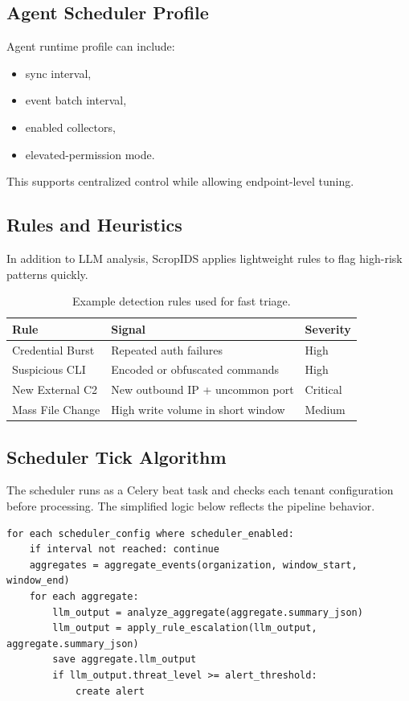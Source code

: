 \documentclass[conference]{IEEEtran}
\begin{document}
\subsection{Agent Scheduler Profile}
Agent runtime profile can include:
\begin{itemize}[leftmargin=1.2em]
    \item sync interval,
    \item event batch interval,
    \item enabled collectors,
    \item elevated-permission mode.
\end{itemize}
This supports centralized control while allowing endpoint-level tuning.

\subsection{Rules and Heuristics}
In addition to LLM analysis, ScropIDS applies lightweight rules to flag high-risk patterns quickly.
\begin{table}[!t]
\centering
\begin{tabular}{>{\raggedright\arraybackslash}p{} >{\raggedright\arraybackslash}p{} >{\raggedright\arraybackslash}p{}}
\toprule
\textbf{Rule} & \textbf{Signal} & \textbf{Severity} \\
\midrule
Credential Burst & Repeated auth failures & High \\
Suspicious CLI & Encoded or obfuscated commands & High \\
New External C2 & New outbound IP + uncommon port & Critical \\
Mass File Change & High write volume in short window & Medium \\
\bottomrule
\end{tabular}
\caption{Example detection rules used for fast triage.}
\label{tab:rules}
\end{table}

\subsection{Scheduler Tick Algorithm}
The scheduler runs as a Celery beat task and checks each tenant configuration before processing. The simplified logic below reflects the pipeline behavior.
\begin{lstlisting}[caption={Scheduler tick pseudocode}]
for each scheduler_config where scheduler_enabled:
    if interval not reached: continue
    aggregates = aggregate_events(organization, window_start, window_end)
    for each aggregate:
        llm_output = analyze_aggregate(aggregate.summary_json)
        llm_output = apply_rule_escalation(llm_output, aggregate.summary_json)
        save aggregate.llm_output
        if llm_output.threat_level >= alert_threshold:
            create alert
\end{lstlisting}
\end{document}

